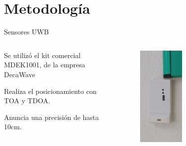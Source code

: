 \documentclass[xcolor=table]{beamer}
\begin{document}
\section{Metodología}

  \begin{frame}{Sensores UWB}
    \begin{columns}
      \begin{column}{0.5\textwidth}
        Se utilizó el kit comercial MDEK1001, de la empresa DecaWave

        \vspace{0.5cm}
        Realiza el posicionamiento con TOA y TDOA.

        \vspace{0.5cm}
        Anuncia una precisión de hasta 10cm.
      \end{column}
      \begin{column}{0.5\textwidth}  
        \begin{figure}[H]
          \centering
          \includegraphics[width=0.45\textwidth]{pic/sensor.jpg}
          \label{fig:robot}
      \end{figure}
      \end{column}
    \end{columns}
  \end{frame}
\end{document}
